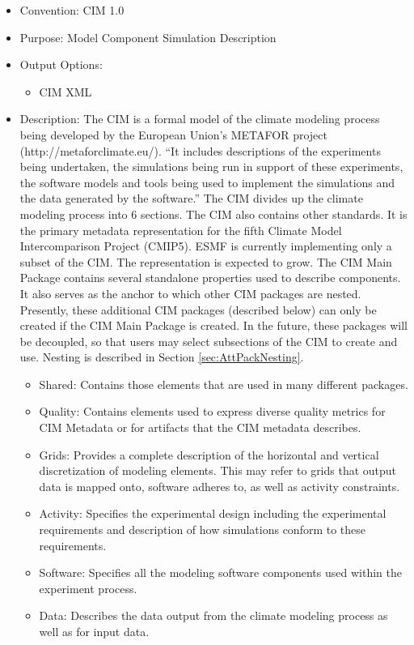 \begin{itemize}
    \item Convention: CIM 1.0
    \item Purpose: Model Component Simulation Description
    \item Output Options: 
    \begin{itemize}
        \item CIM XML
    \end{itemize}  
\item Description: The CIM is a formal model of the climate modeling process being developed by the European Union's METAFOR project (http://metaforclimate.eu/). ``It includes descriptions of the experiments being undertaken, the simulations being run in support of these experiments, the software models and tools being used to implement the simulations and the data generated by the software.'' The CIM divides up the climate modeling process into 6 sections. The CIM also contains other standards. It is the primary metadata representation for the fifth Climate Model Intercomparison Project (CMIP5). ESMF is currently implementing only a subset of the CIM. The representation is expected to grow. The CIM Main Package contains several standalone properties used to describe components. It also serves as the anchor to which other CIM packages are nested. Presently, these additional CIM packages (described below) can only be created if the CIM Main Package is created. In the future, these packages will be decoupled, so that users may select subsections of the CIM to create and use. Nesting is described in Section \ref{sec:AttPackNesting}.
    \begin{itemize}
       \item Shared: Contains those elements that are used in many different packages. 
       \item Quality: Contains elements used to express diverse quality metrics for CIM Metadata or for artifacts that the CIM metadata describes.
       \item Grids: Provides a complete description of the horizontal and vertical discretization of modeling elements. This may refer to grids that output data is mapped onto, software adheres to, as well as activity constraints. 
       \item Activity: Specifies the experimental design including the experimental requirements and description of how simulations conform to these requirements.
       \item Software: Specifies all the modeling software components used within the experiment process. 
       \item Data: Describes the data output from the climate modeling process as well as for input data. 
    \end{itemize}
\end{itemize}

